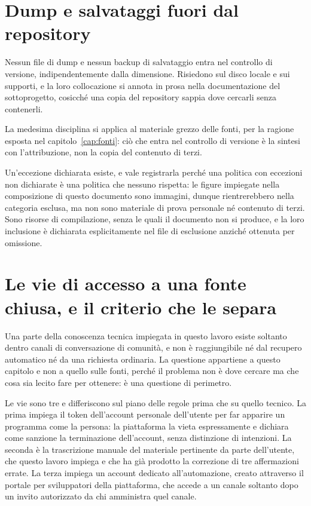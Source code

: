 \section{Dump e salvataggi fuori dal repository}

Nessun file di dump e nessun backup di salvataggio entra nel controllo di versione, indipendentemente dalla dimensione. Risiedono sul disco locale e sui supporti, e la loro collocazione si annota in prosa nella documentazione del sottoprogetto, cosicché una copia del repository sappia dove cercarli senza contenerli.

La medesima disciplina si applica al materiale grezzo delle fonti, per la ragione esposta nel capitolo~\ref{cap:fonti}: ciò che entra nel controllo di versione è la sintesi con l'attribuzione, non la copia del contenuto di terzi.

Un'eccezione dichiarata esiste, e vale registrarla perché una politica con eccezioni non dichiarate è una politica che nessuno rispetta: le figure impiegate nella composizione di questo documento sono immagini, dunque rientrerebbero nella categoria esclusa, ma non sono materiale di prova personale né contenuto di terzi. Sono risorse di compilazione, senza le quali il documento non si produce, e la loro inclusione è dichiarata esplicitamente nel file di esclusione anziché ottenuta per omissione.

\section{Le vie di accesso a una fonte chiusa, e il criterio che le separa}

Una parte della conoscenza tecnica impiegata in questo lavoro esiste soltanto dentro canali di conversazione di comunità, e non è raggiungibile né dal recupero automatico né da una richiesta ordinaria. La questione appartiene a questo capitolo e non a quello sulle fonti, perché il problema non è dove cercare ma che cosa sia lecito fare per ottenere: è una questione di perimetro.

Le vie sono tre e differiscono sul piano delle regole prima che su quello tecnico. La prima impiega il token dell'account personale dell'utente per far apparire un programma come la persona: la piattaforma la vieta espressamente e dichiara come sanzione la terminazione dell'account, senza distinzione di intenzioni. La seconda è la trascrizione manuale del materiale pertinente da parte dell'utente, che questo lavoro impiega e che ha già prodotto la correzione di tre affermazioni errate. La terza impiega un account dedicato all'automazione, creato attraverso il portale per sviluppatori della piattaforma, che accede a un canale soltanto dopo un invito autorizzato da chi amministra quel canale.

